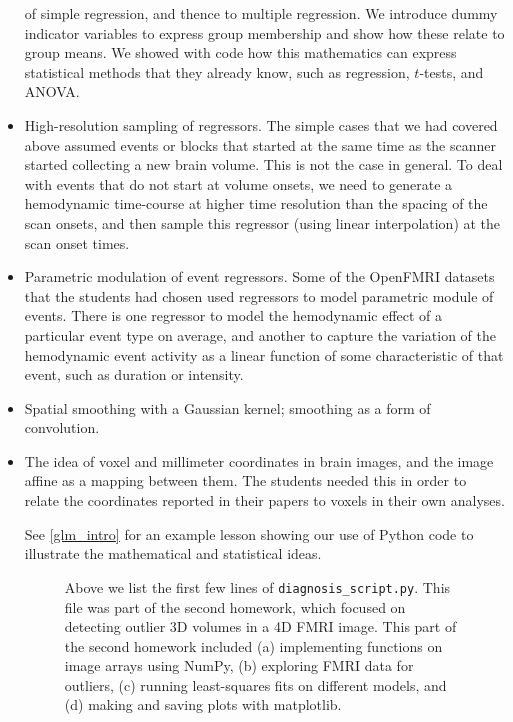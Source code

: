 \begin{itemize}
        of simple regression, and thence to multiple regression.  We introduce
        dummy indicator variables to express group membership and show how
        these relate to group means.  We showed with code how this mathematics
        can express statistical methods that they already know, such as
        regression, $t$-tests, and ANOVA.
\item
    High-resolution sampling of regressors.  The simple cases that we had
        covered above assumed events or blocks that started at the same time
        as the scanner started collecting a new brain volume.  This is not the
        case in general.  To deal with events that do not start at volume
        onsets, we need to generate a hemodynamic time-course at higher
        time resolution than the spacing of the scan onsets, and then sample
        this regressor (using linear interpolation) at the scan onset times.
\item
    Parametric modulation of event regressors.  Some of the OpenFMRI datasets
        that the students had chosen used regressors to model parametric
        module of events.  There is one regressor to model the hemodynamic
        effect of a particular event type on average, and another to capture
        the variation of the hemodynamic event activity as a linear function
        of some characteristic of that event, such as duration or intensity.
\item
    Spatial smoothing with a Gaussian kernel; smoothing as a form of
    convolution.

\item
    The idea of voxel and millimeter coordinates in brain images, and the
    image affine as a mapping between them.  The students needed this in order
    to relate the coordinates reported in their papers to voxels in their own
    analyses.

See \cref{glm_intro} for an example lesson showing our use of Python code to
illustrate the mathematical and statistical ideas.

\begin{figure}
\centering

\caption{Above we list the first few lines of \texttt{diagnosis\_script.py}.
This file was part of the second homework, which focused on detecting outlier
3D volumes in a 4D FMRI image.
This part of the second homework included
(a) implementing functions on image arrays using NumPy,
(b) exploring FMRI data for outliers,
(c) running least-squares fits on different models, and
(d) making and saving plots with matplotlib.}\label{fig:diagnosis_script}
\end{figure}


\end{itemize}

